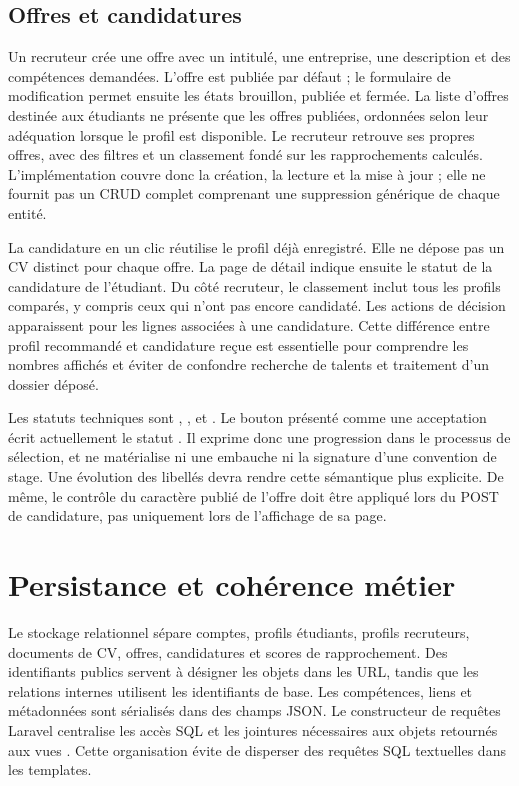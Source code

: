 \subsection{Offres et candidatures}

Un recruteur crée une offre avec un intitulé, une entreprise, une description et des compétences demandées. L'offre est publiée par défaut ; le formulaire de modification permet ensuite les états brouillon, publiée et fermée. La liste d'offres destinée aux étudiants ne présente que les offres publiées, ordonnées selon leur adéquation lorsque le profil est disponible. Le recruteur retrouve ses propres offres, avec des filtres et un classement fondé sur les rapprochements calculés. L'implémentation couvre donc la création, la lecture et la mise à jour ; elle ne fournit pas un CRUD complet comprenant une suppression générique de chaque entité.

La candidature en un clic réutilise le profil déjà enregistré. Elle ne dépose pas un CV distinct pour chaque offre. La page de détail indique ensuite le statut de la candidature de l'étudiant. Du côté recruteur, le classement inclut tous les profils comparés, y compris ceux qui n'ont pas encore candidaté. Les actions de décision apparaissent pour les lignes associées à une candidature. Cette différence entre profil recommandé et candidature reçue est essentielle pour comprendre les nombres affichés et éviter de confondre recherche de talents et traitement d'un dossier déposé.

Les statuts techniques sont , ,  et . Le bouton présenté comme une acceptation écrit actuellement le statut . Il exprime donc une progression dans le processus de sélection, et ne matérialise ni une embauche ni la signature d'une convention de stage. Une évolution des libellés devra rendre cette sémantique plus explicite. De même, le contrôle du caractère publié de l'offre doit être appliqué lors du POST de candidature, pas uniquement lors de l'affichage de sa page.

\section{Persistance et cohérence métier}

Le stockage relationnel sépare comptes, profils étudiants, profils recruteurs, documents de CV, offres, candidatures et scores de rapprochement. Des identifiants publics servent à désigner les objets dans les URL, tandis que les relations internes utilisent les identifiants de base. Les compétences, liens et métadonnées sont sérialisés dans des champs JSON. Le constructeur de requêtes Laravel centralise les accès SQL et les jointures nécessaires aux objets retournés aux vues \cite{laravel-database}. Cette organisation évite de disperser des requêtes SQL textuelles dans les templates.

